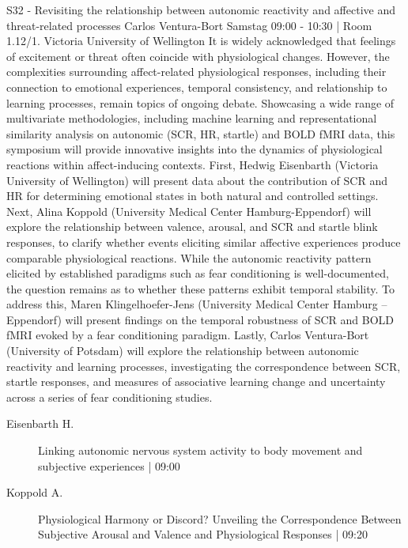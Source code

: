 
            \begin{symposium}
            {S32 - Revisiting the relationship between autonomic reactivity and affective and threat-related processes }
            {Carlos Ventura-Bort }
            {Samstag 09:00 - 10:30 | Room 1.12/1.}
            {Victoria University of Wellington}
            It is widely acknowledged that feelings of excitement or threat often coincide with physiological changes. However, the complexities surrounding affect-related physiological responses, including their connection to emotional experiences, temporal consistency, and relationship to learning processes, remain topics of ongoing debate. Showcasing a wide range of multivariate methodologies, including machine learning and representational similarity analysis on autonomic (SCR, HR, startle) and BOLD fMRI data, this symposium will provide innovative insights into the dynamics of physiological reactions within affect-inducing contexts.
First, Hedwig Eisenbarth (Victoria University of Wellington) will present data about the contribution of SCR and HR for determining emotional states in both natural and controlled settings. Next, Alina Koppold (University Medical Center Hamburg-Eppendorf) will explore the relationship between valence, arousal, and SCR and startle blink responses, to clarify whether events eliciting similar affective experiences produce comparable physiological reactions. While the autonomic reactivity pattern elicited by established paradigms such as fear conditioning is well-documented, the question remains as to whether these patterns exhibit temporal stability. To address this, Maren Klingelhoefer-Jens (University Medical Center Hamburg – Eppendorf) will present findings on the temporal robustness of SCR and BOLD fMRI evoked by a fear conditioning paradigm. Lastly, Carlos Ventura-Bort (University of Potsdam) will explore the relationship between autonomic reactivity and learning processes, investigating the correspondence between SCR, startle responses, and measures of associative learning change and uncertainty across a series of fear conditioning studies.
            \begin{description}    
            
                \item [ Eisenbarth H.] Linking autonomic nervous system activity to body movement and subjective experiences \textcolor{mygray}{ | 09:00}    
                
                \item [ Koppold A.] Physiological Harmony or Discord? Unveiling the Correspondence Between Subjective Arousal and Valence and Physiological Responses \textcolor{mygray}{ | 09:20}    
                

\end{description}
\end{symposium}
